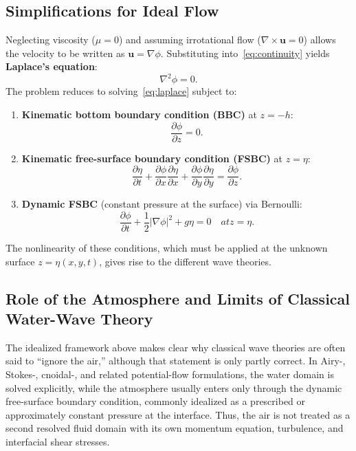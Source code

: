 \documentclass[journal,10pt,twocolumn]{IEEEtran}
\def\text#1{#1}%
\begin{document}
\subsection{Simplifications for Ideal Flow}
Neglecting viscosity ($\mu=0$) and assuming irrotational flow
($\nabla\times\mathbf{u}=0$) allows the velocity to be written as
$\mathbf{u}=\nabla\phi$.
Substituting into~\eqref{eq:continuity} yields \textbf{Laplace's equation}:
\begin{equation}
  \nabla^2\phi = 0.
  \label{eq:laplace}
\end{equation}
The problem reduces to solving~\eqref{eq:laplace} subject to:
\begin{enumerate}
  \item \textbf{Kinematic bottom boundary condition (BBC)} at $z=-h$:
    \begin{equation}
      \frac{\partial\phi}{\partial z} = 0.
    \end{equation}
  \item \textbf{Kinematic free-surface boundary condition (FSBC)} at $z=\eta$:
    \begin{equation}
      \frac{\partial\eta}{\partial t}
        + \frac{\partial\phi}{\partial x}\frac{\partial\eta}{\partial x}
        + \frac{\partial\phi}{\partial y}\frac{\partial\eta}{\partial y}
        = \frac{\partial\phi}{\partial z}.
    \end{equation}
  \item \textbf{Dynamic FSBC} (constant pressure at the surface) via Bernoulli:
    \begin{equation}
      \frac{\partial\phi}{\partial t}
        + \frac{1}{2}|\nabla\phi|^2 + g\eta = 0
        \quad\text{at } z=\eta.
    \end{equation}
\end{enumerate}
The nonlinearity of these conditions, which must be applied at the unknown surface
$z=\eta(x,y,t)$, gives rise to the different wave theories.

\subsection{Role of the Atmosphere and Limits of Classical Water-Wave Theory}
\label{sec:airrole}

The idealized framework above makes clear why classical wave theories are often said to
``ignore the air,'' although that statement is only partly correct.
In Airy-, Stokes-, cnoidal-, and related potential-flow formulations, the water domain is
solved explicitly, while the atmosphere usually enters only through the dynamic
free-surface boundary condition, commonly idealized as a prescribed or approximately
constant pressure at the interface.
Thus, the air is not treated as a second resolved fluid domain with its own momentum
equation, turbulence, and interfacial shear stresses.
\end{document}
